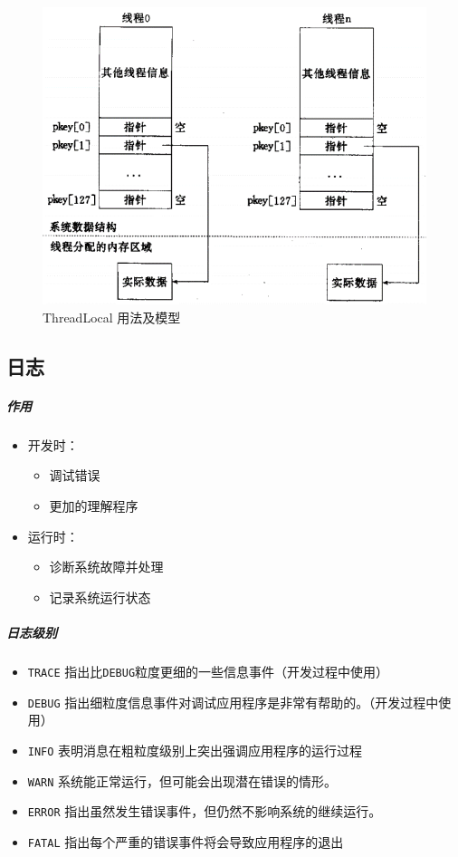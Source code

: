 \documentclass[UTF8,a4paper,8pt]{ctexbook}
\begin{document}
				\begin{figure}[htbp]
					\centering
					\includegraphics[scale= 0.5]{figure/threadLocal.png}
					\caption{ThreadLocal 用法及模型}
				\end{figure}
				
		\subsection{日志}
			\subparagraph{作用}
				\begin{itemize}
					\item 开发时：
						\begin{itemize}
							\item 调试错误
							\item 更加的理解程序
						\end{itemize}
					
					\item 运行时：
						\begin{itemize}
							\item 诊断系统故障并处理
							\item 记录系统运行状态
						\end{itemize}
				\end{itemize}
			\subparagraph{日志级别}
				\begin{itemize}
					\item \verb|TRACE|
					指出比\verb|DEBUG|粒度更细的一些信息事件（开发过程中使用）
					
					\item \verb|DEBUG|
					指出细粒度信息事件对调试应用程序是非常有帮助的。（开发过程中使用）
					
					\item \verb|INFO|
					表明消息在粗粒度级别上突出强调应用程序的运行过程
					
					\item \verb|WARN|
					系统能正常运行，但可能会出现潜在错误的情形。
					
					\item \verb|ERROR|
					指出虽然发生错误事件，但仍然不影响系统的继续运行。
					
					\item \verb|FATAL|
					指出每个严重的错误事件将会导致应用程序的退出
				\end{itemize}
\end{document}
